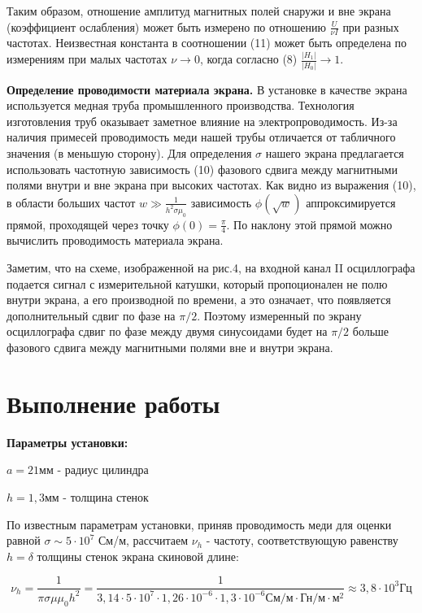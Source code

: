 \documentclass[a4paper,12pt]{report}
\begin{document}
Таким образом, отношение амплитуд магнитных полей снаружи и вне экрана (коэффициент ослабления) может быть измерено по отношению \(\frac{U}{\nu I}\) при разных частотах. Неизвестная константа в соотношении (11) может быть определена по измерениям при малых частотах \(\nu \rightarrow 0\), когда согласно (8) \(\frac{|H_{1}|}{|H_{0}|}\rightarrow 1\).

\textbf{Определение проводимости материала экрана.} В установке в качестве экрана используется медная труба промышленного производства. Технология изготовления труб оказывает заметное влияние на электропроводимость. Из-за наличия примесей проводимость меди нашей трубы отличается от табличного значения (в меньшую сторону). Для определения $\sigma$ нашего экрана предлагается использовать частотную зависимость (10) фазового сдвига между магнитными полями внутри и вне экрана при высоких частотах. Как видно из выражения (10), в области больших частот \(w \gg \frac{1}{h^2\sigma\mu_{0}}\) зависимость \(\phi(\sqrt{w})\) аппроксимируется прямой, проходящей через точку \(\phi(0)=\frac{\pi}{4}\). По наклону этой прямой можно вычислить проводимость материала экрана.

Заметим, что на схеме, изображенной на рис.4, на входной канал II осциллографа подается сигнал с измерительной катушки, который пропоционален не полю внутри экрана, а его производной по времени, а это означает, что появляется дополнительный сдвиг по фазе на $\pi/2$. Поэтому измеренный по экрану осциллографа сдвиг по фазе между двумя синусоидами будет на $\pi/2$ больше фазового сдвига между магнитными полями вне и внутри экрана.


\section*{\huge{Выполнение работы}}
\noindent\textbf{Параметры установки:}

$a = 21$мм - радиус цилиндра

$h = 1,3$мм - толщина стенок

По известным параметрам установки, приняв проводимость меди для оценки равной \(\sigma\sim 5\cdot10^7\) См/м, рассчитаем $\nu_{h}$ - частоту, соответствующую равенству \(h=\delta\) толщины стенок экрана скиновой длине:

\begin{equation*}
    \nu_{h} = \frac{1}{\pi\sigma\mu\mu_{0}h^2}= \frac{1}{3,14\cdot5\cdot10^7\cdot1,26\cdot10^{-6}\cdot1,3\cdot10^{-6}\text{См/м}\cdot\text{Гн/м}\cdot\text{м}^2}\approx 3,8\cdot10^3 \text{Гц}
\end{equation*}
\end{document}
